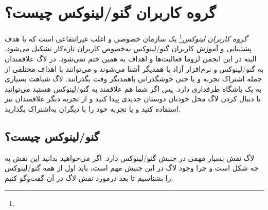 \section{گروه کاربران گنو/لینوکس چیست؟}
\emph{گروه کاربران لینوکس}\footnote{}
یک سازمان خصوصی و اغلب غیرانتفاعی است که با هدف پشتیبانی و آموزش کاربران گنو/لینوکس
به‌خصوص کاربران تازه‌کار تشکیل می‌شود. البته در این انجمن لزوما فعالیت‌ها و اهداف به همین ختم نمی‌شود.
در لاگ علاقمندان به گنو/لینوکس و نرم‌افزار آزاد با همدیگر آشنا می‌شوند و می‌توانند با اهداف مختلفی از جمله
اشتراک تجربه و یا حتی خوشگذرانی باهمدیگر وقت بگذرانند. لاگ شباهت بسیاری به یک باشگاه طرفداری دارد.
پس اگر شما هم علاقمند به گنو/لینوکس هستید می‌توانید با دنبال کردن لاگ محل خودتان دوستان جدیدی
پیدا کنید و از تجربه دیگر علاقمندان نیز استفاده کنید و یا تجربه خود را با دیگران به‌اشتراک بگذارید.

\subsection{گنو/لینوکس چیست؟}
لاگ نقش بسیار مهمی در جنبش گنو/لینوکس دارد. اگر می‌خواهید بدانید این نقش به چه شکل است
و چرا وجود لاگ در این جنبش مهم است، باید اول از همه گنو/لینوکس را بشناسیم تا بعد درمورد
نقش لاگ در آن گفت‌وگو کنیم.

